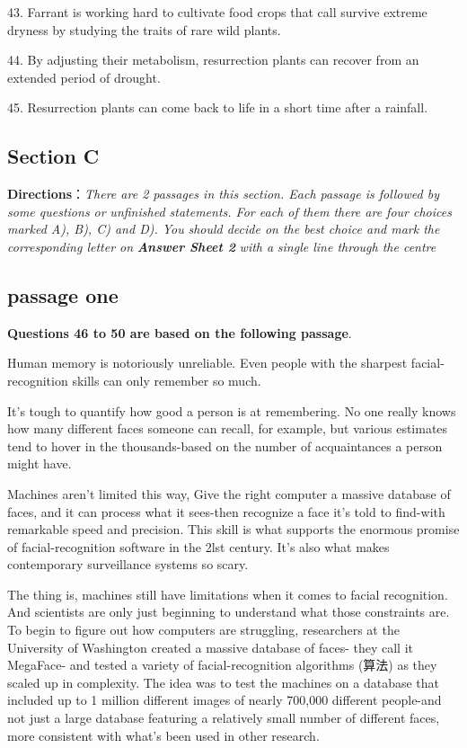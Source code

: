\documentclass[UTF8,11pt]{ctexart}
\begin{document}
43. Farrant is working hard to cultivate food crops that call survive extreme dryness by studying the traits of rare wild plants.


44. By adjusting their metabolism, resurrection plants can recover from an extended period of drought.


45. Resurrection plants can come back to life in a short time after a rainfall.


\subsection*{\textbf{Section C}}


\textbf{Directions}：\textit{There are 2 passages in this section. Each passage is followed by some questions or} \textit{unfinished statements. For each of them there are four choices marked A), B), C) and D). You} \textit{should decide on the best choice and mark the corresponding letter on}\textbf{\textit{ Answer Sheet 2}}\textit{ with a} \textit{single line through the centre}


\subsection*{\textbf{passage one}}


\textbf{Questions 46 to 50 are based on the following passage}.


Human memory is notoriously unreliable. Even people with the sharpest facial-recognition skills can only remember so much.


It's tough to quantify how good a person is at remembering. No one really knows how many different faces someone can recall, for example, but various estimates tend to hover in the thousands-based on the number of acquaintances a person might have.


Machines aren't limited this way, Give the right computer a massive database of faces, and it can process what it sees-then recognize a face it's told to find-with remarkable speed and precision. This skill is what supports the enormous promise of facial-recognition software in the 2lst century. It's also what makes contemporary surveillance systems so scary.


The thing is, machines still have limitations when it comes to facial recognition. And scientists are only just beginning to understand what those constraints are. To begin to figure out how computers are struggling, researchers at the University of Washington created a massive database of faces- they call it MegaFace- and tested a variety of facial-recognition algorithms (算法) as they scaled up in complexity. The idea was to test the machines on a database that included up to 1 million different images of nearly 700,000 different people-and not just a large database featuring a relatively small number of different faces, more consistent with what's been used in other research.
\end{document}
